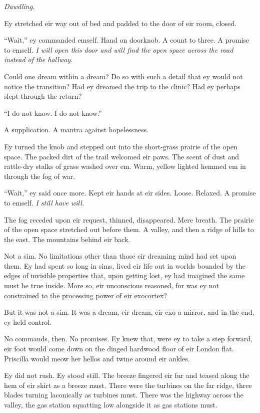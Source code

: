 \emph{Dawdling.}

Ey stretched eir way out of bed and padded to the door of eir room, closed.

``Wait,'' ey commanded emself. Hand on doorknob. A count to three. A promise to emself. \emph{I will open this door and will find the open space across the road instead of the hallway.}

Could one dream within a dream? Do so with such a detail that ey would not notice the transition? Had ey dreamed the trip to the clinic? Had ey perhaps slept through the return?

``I do not know. I do not know.''

A supplication. A mantra against hopelessness.

Ey turned the knob and stepped out into the short-grass prairie of the open space. The packed dirt of the trail welcomed eir paws. The scent of dust and rattle-dry stalks of grass washed over em. Warm, yellow lighted hemmed em in through the fog of war.

``Wait,'' ey said once more. Kept eir hands at eir sides. Loose. Relaxed. A promise to emself. \emph{I still have will.}

The fog receded upon eir request, thinned, disappeared. Mere breath. The prairie of the open space stretched out before them. A valley, and then a ridge of hills to the east. The mountains behind eir back.

Not a sim. No limitations other than those eir dreaming mind had set upon them. Ey had spent so long in sims, lived eir life out in worlds bounded by the edges of invisible properties that, upon getting lost, ey had imagined the same must be true inside. More so, eir unconscious reasoned, for was ey not constrained to the processing power of eir exocortex?

But it was not a sim. It was a dream, eir dream, eir exo a mirror, and in the end, ey held control.

No commands, then. No promises. Ey knew that, were ey to take a step forward, eir foot would come down on the dinged hardwood floor of eir London flat. Priscilla would meow her hellos and twine around eir ankles.

Ey did not rush. Ey stood still. The breeze fingered eir fur and teased along the hem of eir skirt as a breeze must. There were the turbines on the far ridge, three blades turning laconically as turbines must. There was the highway across the valley, the gas station squatting low alongside it as gas stations must.

